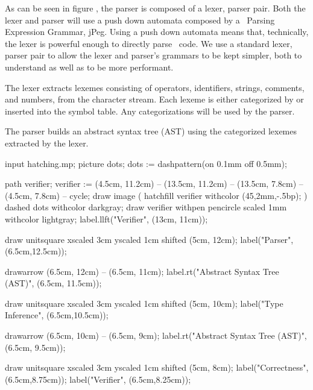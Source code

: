 As can be seen in figure , the parser is composed of a 
lexer, parser pair. Both the lexer and parser will use a push down 
automata composed by a \joylol\ Parsing Expression Grammar, jPeg. Using a 
push down automata means that, technically, the lexer is powerful enough 
to directly parse \joylol\ code. We use a standard lexer, parser pair to 
allow the lexer and parser's grammars to be kept simpler, both to 
understand as well as to be more performant. 

\startitemize[2]

\item {}

The lexer extracts lexemes consisting of operators, identifiers, strings, 
comments, and numbers, from the character stream. Each lexeme is either 
categorized by or inserted into the symbol table. Any categorizations will 
be used by the parser. 

\item {}

The parser builds an abstract syntax tree (AST) using the categorized 
lexemes extracted by the lexer. 

\stopitemize

\item {}

\bgroup\startMPcode
input hatching.mp;
picture dots; dots := dashpattern(on 0.1mm off 0.5mm);

path verifier;
verifier := (4.5cm, 11.2cm) -- (13.5cm, 11.2cm) --
            (13.5cm, 7.8cm) -- (4.5cm, 7.8cm)   -- cycle;
draw image (
  hatchfill verifier
    withcolor (45,2mm,-.5bp);
) dashed dots withcolor darkgray;
draw verifier
  withpen pencircle scaled 1mm
  withcolor lightgray;
label.llft("Verifier", (13cm, 11cm));

draw unitsquare xscaled 3cm yscaled 1cm shifted (5cm, 12cm);
label("Parser", (6.5cm,12.5cm));

drawarrow (6.5cm, 12cm) -- (6.5cm, 11cm);
label.rt("Abstract Syntax Tree (AST)", (6.5cm, 11.5cm));

draw unitsquare xscaled 3cm yscaled 1cm shifted (5cm, 10cm);
label("Type Inference", (6.5cm,10.5cm));

drawarrow (6.5cm, 10cm) -- (6.5cm, 9cm);
label.rt("Abstract Syntax Tree (AST)", (6.5cm, 9.5cm));

draw unitsquare xscaled 3cm yscaled 1cm shifted (5cm, 8cm);
label("Correctness", (6.5cm,8.75cm));
label("Verifier", (6.5cm,8.25cm));


